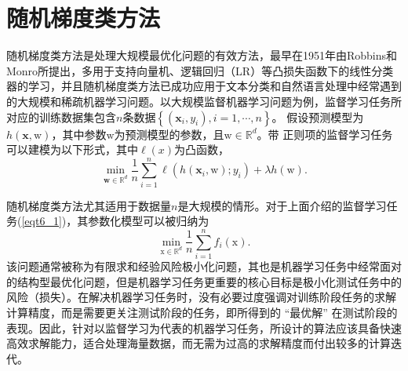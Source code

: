 \section{随机梯度类方法}
随机梯度类方法是处理大规模最优化问题的有效方法，最早在1951年由Robbins和Monro所提出\cite{SGD}，多用于支持向量机、逻辑回归（LR）等凸损失函数下的线性分类器的学习，并且随机梯度类方法已成功应用于文本分类和自然语言处理中经常遇到的大规模和稀疏机器学习问题。以大规模监督机器学习问题为例，监督学习任务所对应的训练数据集包含$n$条数据$\left\{\left(\bm{x}_{i}, y_{i}\right), i=1, \cdots, n\right\}$。 假设预测模型为$h(\bm{x}, \mathrm{w})$，其中参数$\mathrm{w}$为预测模型的参数，且$\mathrm{w} \in \mathbb{R}^{d}$。带 正则项的监督学习任务可以建模为以下形式，其中$\ell(x)$为凸函数，
\begin{equation}
    \min _{\mathbf{w} \in \mathbb{R}^{d}} \frac{1}{n} \sum_{i=1}^{n} \ell\left(h\left(\bm{x}_{i}, \mathrm{w}\right) ; y_{i}\right)+\lambda h(\mathrm{w}) .
    \label{eqt6_1}
\end{equation}

\par 随机梯度类方法尤其适用于数据量$n$是大规模的情形。对于上面介绍的监督学习任务(\ref{eqt6_1})，其参数化模型可以被归纳为
\begin{equation}
    \min _{\mathrm{x} \in \mathbb{R}^{d}} \frac{1}{n} \sum_{i=1}^{n} f_{i}(\mathrm{x}) .
    \label{eqt6_2}
\end{equation}
该问题通常被称为有限求和经验风险极小化问题，其也是机器学习任务中经常面对的结构型最优化问题，但是机器学习任务更重要的核心目标是极小化测试任务中的风险（损失）。在解决机器学习任务时，没有必要过度强调对训练阶段任务的求解计算精度，而是需要更关注测试阶段的任务，即所得到的 “最优解” 在测试阶段的表现。因此，针对以监督学习为代表的机器学习任务，所设计的算法应该具备快速高效求解能力，适合处理海量数据，而无需为过高的求解精度而付出较多的计算迭代。

